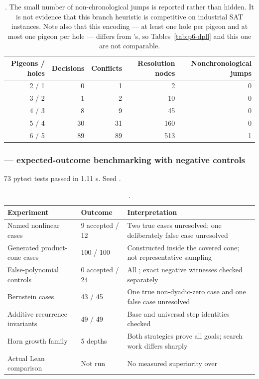 \begin{table}[htbp]
\centering\small
\begin{tabular}{@{}rrrrr@{}}
\toprule
Pigeons / holes & Decisions & Conflicts & Resolution nodes & Nonchronological jumps \\
\midrule
2 / 1 &  0 &  1 &   2 & 0 \\
3 / 2 &  1 &  2 &  10 & 0 \\
4 / 3 &  8 &  9 &  45 & 0 \\
5 / 4 & 30 & 31 & 160 & 0 \\
6 / 5 & 89 & 89 & 513 & 1 \\
\bottomrule
\end{tabular}
\caption{. The small number of non-chronological jumps is reported
rather than hidden. It is not evidence that this branch heuristic is competitive
on industrial SAT instances. Note also that this encoding --- at least one hole
per pigeon and at most one pigeon per hole --- differs from 's, so
Tables~\ref{tab:p6-dpll} and this one are not comparable.}
\label{tab:p4-pigeonhole}
\end{table}

\subsubsection*{ --- expected-outcome benchmarking with negative controls}

73 pytest tests passed in 1.11 s. Seed .

\begin{table}[htbp]
\centering\small
\begin{tabular}{@{}lll@{}}
\toprule
Experiment & Outcome & Interpretation \\
\midrule
Named nonlinear cases & 9 accepted / 12 &
Two true cases unresolved; one deliberately false case unresolved \\
Generated product-cone cases & 100 / 100 &
Constructed inside the covered cone; not representative sampling \\
False-polynomial controls & 0 accepted / 24 &
All \unknown{}; exact negative witnesses checked separately \\
Bernstein cases & 43 / 45 &
One true non-dyadic-zero case and one false case unresolved \\
Additive recurrence invariants & 49 / 49 &
Base and universal step identities checked \\
Horn growth family & 5 depths &
Both strategies prove all goals; search work differs sharply \\
Actual Lean comparison & Not run & No measured superiority over \grind{} \\
\bottomrule
\end{tabular}
\caption{.}
\label{tab:p5}
\end{table}

